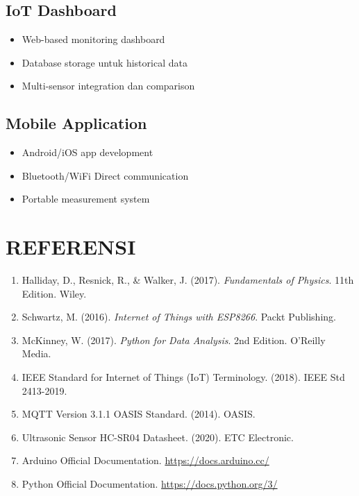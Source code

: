 \documentclass[12pt,a4paper]{article}
\begin{document}
\subsection{IoT Dashboard}
\begin{itemize}
    \item Web-based monitoring dashboard
    \item Database storage untuk historical data
    \item Multi-sensor integration dan comparison
\end{itemize}

\subsection{Mobile Application}
\begin{itemize}
    \item Android/iOS app development
    \item Bluetooth/WiFi Direct communication
    \item Portable measurement system
\end{itemize}

\section{REFERENSI}

\begin{enumerate}
    \item Halliday, D., Resnick, R., \& Walker, J. (2017). \textit{Fundamentals of Physics}. 11th Edition. Wiley.
    
    \item Schwartz, M. (2016). \textit{Internet of Things with ESP8266}. Packt Publishing.
    
    \item McKinney, W. (2017). \textit{Python for Data Analysis}. 2nd Edition. O'Reilly Media.
    
    \item IEEE Standard for Internet of Things (IoT) Terminology. (2018). IEEE Std 2413-2019.
    
    \item MQTT Version 3.1.1 OASIS Standard. (2014). OASIS.
    
    \item Ultrasonic Sensor HC-SR04 Datasheet. (2020). ETC Electronic.
    
    \item Arduino Official Documentation. \url{https://docs.arduino.cc/}
    
    \item Python Official Documentation. \url{https://docs.python.org/3/}
\end{enumerate}
\end{document}
